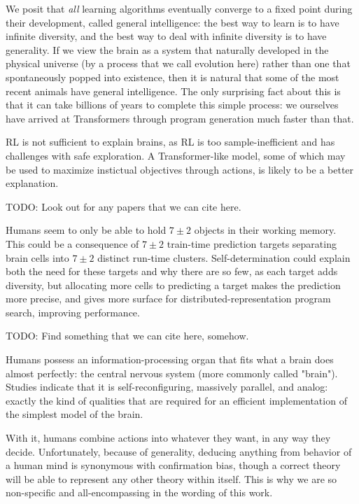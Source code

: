 \documentclass{article}
\begin{document}
We posit that \textit{all} learning algorithms eventually converge to a fixed point during their development, called general intelligence: the best way to learn is to have infinite diversity, and the best way to deal with infinite diversity is to have generality. If we view the brain as a system that naturally developed in the physical universe (by a process that we call evolution here) rather than one that spontaneously popped into existence, then it is natural that some of the most recent animals have general intelligence. The only surprising fact about this is that it can take billions of years to complete this simple process: we ourselves have arrived at Transformers through program generation much faster than that.

RL is not sufficient to explain brains, as RL is too sample-inefficient and has challenges with safe exploration. A Transformer-like model, some of which may be used to maximize instictual objectives through actions, is likely to be a better explanation.

    TODO: Look out for any papers that we can cite here.

Humans seem to only be able to hold $7\pm2$ objects in their working memory. This could be a consequence of $7\pm2$ train-time prediction targets separating brain cells into $7\pm2$ distinct run-time clusters. Self-determination could explain both the need for these targets and why there are so few, as each target adds diversity, but allocating more cells to predicting a target makes the prediction more precise, and gives more surface for distributed-representation program search, improving performance.

    TODO: Find something that we can cite here, somehow.

Humans possess an information-processing organ that fits what a brain does almost perfectly: the central nervous system (more commonly called "brain"). Studies indicate that it is self-reconfiguring, massively parallel, and analog: exactly the kind of qualities that are required for an efficient implementation of the simplest model of the brain.

With it, humans combine actions into whatever they want, in any way they decide. Unfortunately, because of generality, deducing anything from behavior of a human mind is synonymous with confirmation bias, though a correct theory will be able to represent any other theory within itself. This is why we are so non-specific and all-encompassing in the wording of this work.
\end{document}
